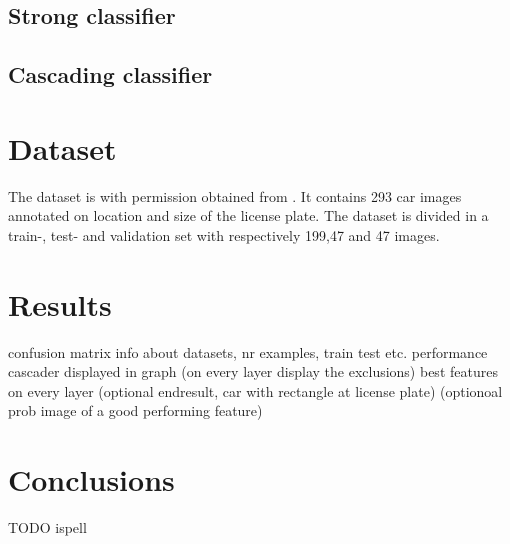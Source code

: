 \documentclass[a4paper,11pt]{article}
\begin{document}
\subsection*{Strong classifier}
\subsection*{Cascading classifier}


\section*{Dataset}
The dataset is with permission obtained from \cite{dlagnekov_dataset}. It
contains 293 car images annotated on location and size of the license plate.
The dataset is divided in a train-, test- and validation set with respectively
199,47 and 47 images.

\section*{Results}
confusion matrix
info about datasets, nr examples, train test etc.
performance cascader displayed in graph (on every layer display the exclusions)
best features on every layer
(optional endresult, car with rectangle at license plate)
(optionoal prob image of a good performing feature)


\section*{Conclusions}
TODO ispell

\renewcommand\bibname{References}


\end{document}
